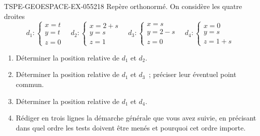 \begin{exercice}{TSPE-GEOESPACE-EX-055}{2}{18}
Repère orthonormé. On considère les quatre droites
\[
  d_1:\begin{cases}x=t\\y=t\\z=0\end{cases}
  \quad
  d_2:\begin{cases}x=2+s\\y=s\\z=1\end{cases}
  \quad
  d_3:\begin{cases}x=s\\y=2-s\\z=0\end{cases}
  \quad
  d_4:\begin{cases}x=0\\y=s\\z=1+s\end{cases}
\]
\begin{enumerate}
  \item Déterminer la position relative de $d_1$ et $d_2$.
  \item Déterminer la position relative de $d_1$ et $d_3$~; préciser leur
        éventuel point commun.
  \item Déterminer la position relative de $d_1$ et $d_4$.
  \item Rédiger en trois lignes la démarche générale que vous avez suivie, en
        précisant dans quel ordre les tests doivent être menés et pourquoi cet
        ordre importe.
\end{enumerate}
\end{exercice}
